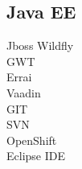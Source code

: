 \documentclass[letterpaper]{deedy-resume} %
\begin{document}
\begin{minipage}[t]{0.33\textwidth}
\sectionspace %


\subsection{Java EE}
Jboss Wildfly \\
GWT \\
Errai \\
Vaadin \\
GIT \\
SVN \\
OpenShift \\
Eclipse IDE \\



\end{minipage} %
\hfill
%
%
\end{document}
